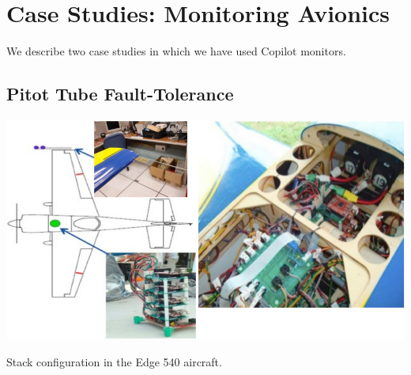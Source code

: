 \section{Case Studies: Monitoring Avionics}
\label{sec:case-study}

We describe two case studies in which we have used Copilot monitors.

\subsection{Pitot Tube Fault-Tolerance}


\begin{myfig}[ht!]
\includegraphics[scale=0.4]{Figs/experiment}
\caption{Stack configuration in the Edge 540 aircraft.\label{fig:setup}}
\end{myfig}

